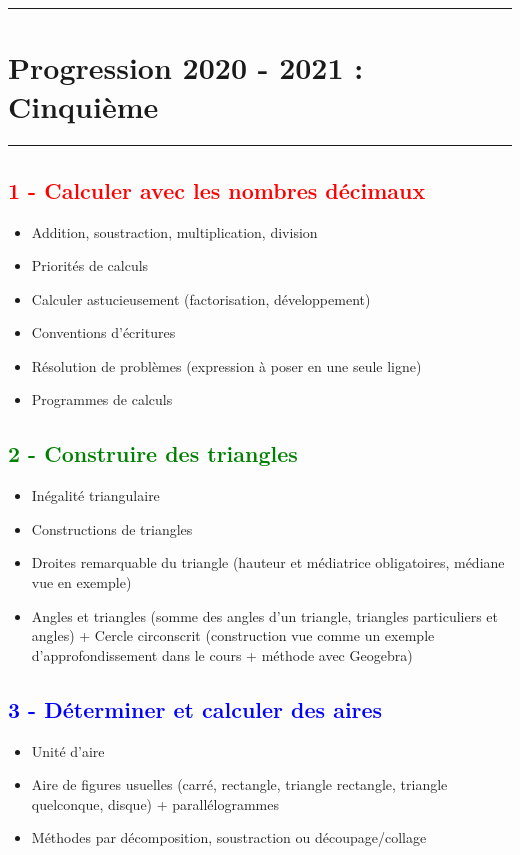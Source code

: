 \documentclass[12pt]{article}
\newcommand{\horrule}[1]{\rule{\linewidth}{#1}} %
\begin{document}
\setlength{\columnseprule}{1pt}

\horrule{2px}
\section*{Progression 2020 - 2021 : Cinquième}
\horrule{2px}

\begin{multicols}{2}

\subsection*{\textcolor{red}{1 - Calculer avec les nombres décimaux}}

\begin{itemize}
\item Addition, soustraction, multiplication, division
\item Priorités de calculs 
\item Calculer astucieusement (factorisation, développement)
\item Conventions d’écritures
\item Résolution de problèmes (expression à poser en une seule ligne)
\item Programmes de calculs
\end{itemize}

\subsection*{\textcolor{green}{2 - Construire des triangles}}

\begin{itemize}
\item Inégalité triangulaire
\item Constructions de triangles
\item Droites remarquable du triangle (hauteur et médiatrice obligatoires, médiane vue en exemple)
\item Angles et triangles (somme des angles d’un triangle, triangles particuliers et angles)
+ Cercle circonscrit (construction vue comme un exemple d'approfondissement dans le cours + méthode avec Geogebra)
\end{itemize}

\subsection*{\textcolor{blue}{3 - Déterminer et calculer des aires}}

\begin{itemize}
\item Unité d’aire
\item Aire de figures usuelles (carré, rectangle, triangle rectangle, triangle quelconque, disque) + parallélogrammes
\item Méthodes par décomposition, soustraction ou découpage/collage
\end{itemize}


\end{multicols}
\end{document}
